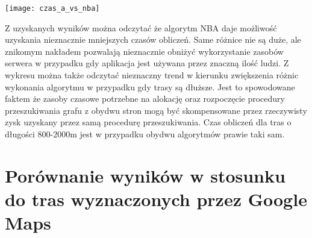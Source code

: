 \begin{center}
\texttt{[image: czas\_a\_vs\_nba]}
\end{center}

Z uzyskanych wyników można odczytać że algorytm NBA daje możliwość uzyskania nieznacznie mniejszych czasów obliczeń. Same różnice nie są duże, ale znikomym nakładem pozwalają nieznacznie obniżyć wykorzystanie zasobów serwera w przypadku gdy aplikacja jest używana przez znaczną ilość ludzi. Z wykresu można także odczytać nieznaczny trend w kierunku zwiększenia różnic wykonania algorytmu w przypadku gdy trasy są dłuższe. Jest to spowodowane faktem że zasoby czasowe potrzebne na alokację oraz rozpoczęcie procedury przeszukiwania grafu z obydwu stron mogą być skompensowane przez rzeczywisty zysk uzyskany przez samą procedurę przeszukiwania. Czas obliczeń dla tras o długości 800-2000m jest w przypadku obydwu algorytmów prawie taki sam.

\section{Porównanie wyników w stosunku do tras wyznaczonych przez Google Maps}